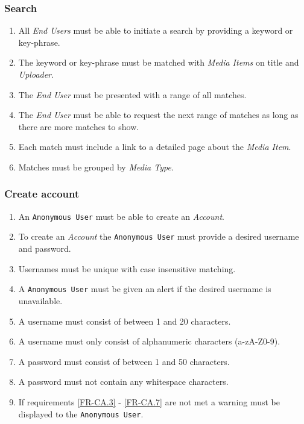 \documentclass[../report.tex]{subfiles}
\begin{document}
\label{sec:Functional Requirements}


\subsubsection {Search}

\begin{enumerate}[label=\textbf{FR-\twodigits*}]

	\item All \textit{End Users} must be able to initiate a search by providing a keyword or key-phrase.
	\item The keyword or key-phrase must be matched with \textit{Media Items} on title and \textit{Uploader}.
	\item The \textit{End User} must be presented with a range of all matches.
	\item The \textit{End User} must be able to request the next range of matches as long as there are more matches to show.
	\item Each match must include a link to a detailed page about the \textit{Media Item}.
	\item Matches must be grouped by \textit{Media Type}. 
\end{enumerate}	
			
\subsubsection{Create account}

\begin{enumerate}[label=\textbf{FR-\twodigits*}, resume]
	\item An \texttt{Anonymous User} must be able to create an \textit{Account}.
	\item To create an \textit{Account} the \texttt{Anonymous User} must provide a desired username and password.
	\item Usernames must be unique with case insensitive matching. \label{FR-CA.3}
	\item A \texttt{Anonymous User} must be given an alert if the desired username is unavailable.
	\item A username must consist of between 1 and 20 characters.
	\item A username must only consist of alphanumeric characters (a-zA-Z0-9).
	\item A password must consist of between 1 and 50 characters. 
	\label{FR-CA.6}
	\item A password must not contain any whitespace characters. \label{FR-CA.7}
	\item If requirements \ref{FR-CA.3} - \ref{FR-CA.7} are not met a warning must be displayed to the \texttt{Anonymous User}.
\end{enumerate}
	
\end{document}
